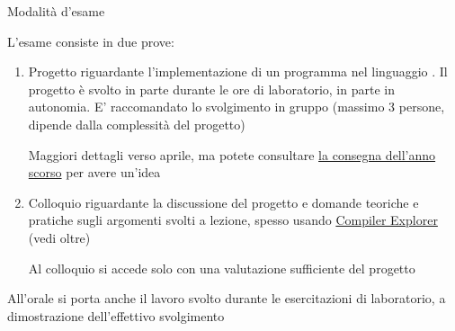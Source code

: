 \begin{frame}{Modalità d'esame}

  L'esame consiste in due prove:

  \begin{enumerate}

  \item Progetto riguardante l'implementazione di un programma nel linguaggio
    \Cpp{}. Il progetto è svolto in parte durante le ore di laboratorio, in
    parte in autonomia. E' raccomandato lo svolgimento in gruppo (massimo 3
    persone, dipende dalla complessità del progetto)

    Maggiori dettagli verso aprile, ma potete consultare
    \href{https://github.com/Programmazione-per-la-Fisica/progetto2025}{la
      consegna dell'anno scorso} per avere un'idea

  \item Colloquio riguardante la discussione del progetto e domande
    teoriche e pratiche sugli argomenti svolti a lezione, spesso
    usando \href{https://godbolt.org/}{Compiler Explorer} (vedi oltre)

    Al colloquio si accede solo con una valutazione sufficiente del progetto

  \end{enumerate}

  All'orale si porta anche il lavoro svolto durante le esercitazioni di
  laboratorio, a dimostrazione dell'effettivo svolgimento

\end{frame}

